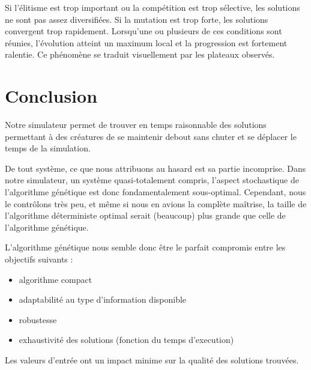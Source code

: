 \documentclass[journal, a4paper]{IEEEtran}
\begin{document}
	Si l'élitisme est trop important ou la compétition est trop sélective,
	les solutions
	ne sont pas assez diversifiées.
	Si la mutation est trop forte, les solutions convergent trop rapidement.
	Lorsqu'une ou plusieurs de ces conditions sont réunies, l'évolution
	atteint un maximum local et la progression est fortement ralentie.
	Ce phénomène se traduit visuellement par les plateaux observés.

\section{Conclusion}\label{sec:conclusion}
	Notre simulateur permet de trouver en temps raisonnable des
	solutions permettant à des créatures de se maintenir debout sans
	chuter et se déplacer le temps de la simulation.

	De tout système, ce que nous attribuons au hasard est sa partie
	incomprise.
	Dans notre simulateur, un système quasi-totalement compris,
	l'aspect stochastique	de
	l'algorithme génétique est donc fondamentalement sous-optimal.
	Cependant, nous le contrôlons très peu, et même si nous en avions
	la
	complète maîtrise, la taille de l'algorithme déterministe optimal
	serait (beaucoup) plus grande que celle de l'algorithme génétique.

	L'algorithme génétique nous semble donc être le parfait compromis
	entre les objectifs suivants :
	\begin{itemize}
		\item algorithme compact
		\item adaptabilité au type d'information disponible
		\item robustesse
		\item exhaustivité des solutions (fonction du temps d'execution)
	\end{itemize}

	Les valeurs d'entrée ont un impact minime sur la qualité
	des solutions trouvées.
\end{document}
